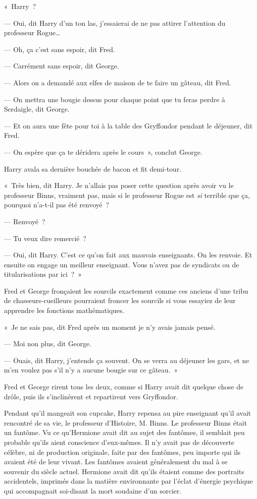 «~Harry~?

--- Oui, dit Harry d'un ton las, j'essaierai de ne pas attirer l'attention du professeur Rogue…

--- Oh, ça c'est sans espoir, dit Fred.

--- Carrément sans espoir, dit George.

--- Alors on a demandé aux elfes de maison de te faire un gâteau, dit Fred.

--- On mettra une bougie dessus pour chaque point que tu feras perdre à Serdaigle, dit George.

--- Et on aura une fête pour toi à la table des Gryffondor pendant le déjeuner, dit Fred.

--- On espère que ça te déridera après le cours~», conclut George.

Harry avala sa dernière bouchée de bacon et fit demi-tour.

«~Très bien, dit Harry.
Je n'allais pas poser cette question après avoir vu le professeur Binns, vraiment pas, mais si le professeur Rogue est \emph{si} terrible que ça, pourquoi n'a-t-il pas été renvoyé~?

--- Renvoyé~?

--- Tu veux dire remercié~?

--- Oui, dit Harry.
C'est ce qu'on fait aux mauvais enseignants.
On les renvoie.
Et ensuite on engage un meilleur enseignant.
Vous n'avez pas de syndicats ou de titularisations par ici~?~»

Fred et George fronçaient les sourcils exactement comme ces anciens d'une tribu de chasseurs-cueilleurs pourraient froncer les sourcils si vous essayiez de leur apprendre les fonctions mathématiques.

«~Je ne sais pas, dit Fred après un moment je n'y avais jamais pensé.

--- Moi non plus, dit George.

--- Ouais, dit Harry, j'entends ça souvent.
On se verra au déjeuner les gars, et ne m'en voulez pas s'il n'y a aucune bougie sur ce gâteau.~»

Fred et George rirent tous les deux, comme si Harry avait dit quelque chose de drôle, puis ils s'inclinèrent et repartirent vers Gryffondor.

Pendant qu'il mangeait son cupcake, Harry repensa au pire enseignant qu'il avait rencontré de sa vie, le professeur d'Histoire, M. Binns.
Le professeur Binns était un fantôme.
Vu ce qu'Hermione avait dit au sujet des fantômes, il semblait peu probable qu'ils aient conscience d'eux-mêmes.
Il n'y avait pas de découverte célèbre, ni de production originale, faite par des fantômes, peu importe qui ils avaient été de leur vivant.
Les fantômes avaient généralement du mal à se souvenir du siècle actuel.
Hermione avait dit qu'ils étaient comme des portraits accidentels, imprimés dans la matière environnante par l'éclat d'énergie psychique qui accompagnait soi-disant la mort soudaine d'un sorcier.

